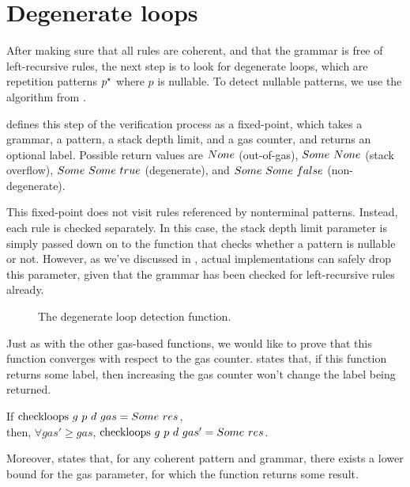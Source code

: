 \section{Degenerate loops}

After making sure that
all rules are coherent,
and that the grammar is free of left-recursive rules,
the next step is to look for degenerate loops,
which are repetition patterns $p^\star$
where $p$ is nullable.
To detect nullable patterns,
we use the algorithm from
.

defines this step of the verification process
as a fixed-point,
which takes a grammar,
a pattern,
a stack depth limit,
and a gas counter,
and returns an optional label.
Possible return values are
$None$ (out-of-gas),
$Some\ None$ (stack overflow),
$Some\ Some\ true$ (degenerate),
and $Some\ Some\ false$ (non-degenerate).

This fixed-point does not visit rules
referenced by nonterminal patterns.
Instead, each rule is checked separately.
In this case, the stack depth limit parameter
is simply passed down on to the function that
checks whether a pattern is nullable or not.
However, as we've discussed in ,
actual implementations can safely drop this parameter,
given that the grammar has been checked
for left-recursive rules already.

\begin{figure}
    \centering
    
    \caption{The degenerate loop detection function.}
    \label{fig:checkloops-function}
\end{figure}

Just as with the other gas-based functions,
we would like to prove that this function
converges with respect to the gas counter.
states that, if this function returns some label,
then increasing the gas counter
won't change the label being returned.

\begin{lemma}%
    If $\text{checkloops}\ g\ p\ d\ gas = Some\ res$, \\
    then, $\forall gas' \ge gas$,
    $\text{checkloops}\ g\ p\ d\ gas' = Some\ res$.
    \label{lemma:checkloops-gas-convergence}
\end{lemma}

Moreover, 
states that, for any coherent pattern and grammar,
there exists a lower bound for the gas parameter,
for which the function returns some result.

